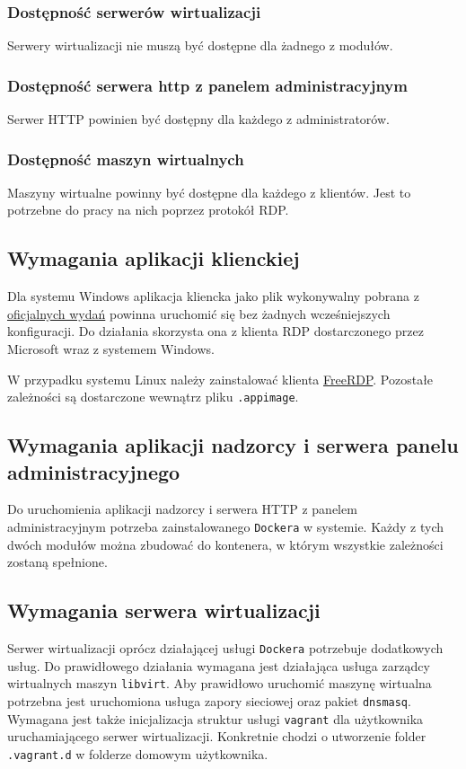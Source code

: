 \documentclass[../opis-rozwiazania.tex]{subfiles}
\begin{document}
\subsubsection{Dostępność serwerów wirtualizacji}
Serwery wirtualizacji nie muszą być dostępne dla żadnego z modułów.

\subsubsection{Dostępność serwera http z panelem administracyjnym}
Serwer HTTP powinien być dostępny dla każdego z administratorów.

\subsubsection{Dostępność maszyn wirtualnych}
Maszyny wirtualne powinny być dostępne dla każdego z klientów.
Jest to potrzebne do pracy na nich poprzez protokół RDP.

\subsection{Wymagania aplikacji klienckiej}
Dla systemu Windows aplikacja kliencka jako plik wykonywalny pobrana z \href{https://github.com/one-click-desktop/client/releases}{oficjalnych wydań} powinna uruchomić się bez żadnych wcześniejszych konfiguracji.
Do działania skorzysta ona z klienta RDP dostarczonego przez Microsoft wraz z systemem Windows.

W przypadku systemu Linux należy zainstalować klienta \href{https://www.freerdp.com/}{FreeRDP}. Pozostałe zależności są dostarczone wewnątrz pliku \texttt{.appimage}.

\subsection {Wymagania aplikacji nadzorcy i serwera panelu administracyjnego}
Do uruchomienia aplikacji nadzorcy i serwera HTTP z panelem administracyjnym potrzeba zainstalowanego \texttt{Dockera} w systemie.
Każdy z tych dwóch modułów można zbudować do kontenera, w którym wszystkie zależności zostaną spełnione.

\subsection{Wymagania serwera wirtualizacji}
\label{system_requirements.virtsrv_rquirements}
Serwer wirtualizacji oprócz działającej usługi \texttt{Dockera} potrzebuje dodatkowych usług.
Do prawidłowego działania wymagana jest działająca usługa zarządcy wirtualnych maszyn \texttt{libvirt}.
Aby prawidłowo uruchomić maszynę wirtualna potrzebna jest uruchomiona usługa zapory sieciowej oraz pakiet \texttt{dnsmasq}.
Wymagana jest także inicjalizacja struktur usługi \texttt{vagrant} dla użytkownika uruchamiającego serwer wirtualizacji.
Konkretnie chodzi o utworzenie folder \texttt{.vagrant.d} w folderze domowym użytkownika.
\end{document}
